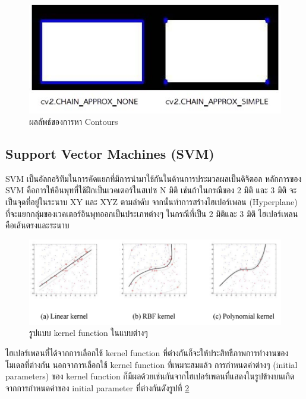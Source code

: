 		\begin{figure}[H]
			\includegraphics[width=\columnwidth]{Figures/2/chain_approx_none_vs_simple}
			\caption{ผลลัพธ์ของการหา Contours}
			\label{Fig:chain_approx_none_vs_simple}
		\end{figure}
	
	
	\subsection{Support Vector Machines (SVM)}
	SVM เป็นอัลกอริทึมในการคัดแยกที่มีการนำมาใช้กันในด้านการประมวลผลเป็นดิจิตอล 
	หลักการของ SVM คือการให้อินพุทที่ใช้ฝึกเป็นเวคเตอร์ในสเปซ N มิติ เช่นถ้าในกรณีของ 2 มิติ และ 3 มิติ 
	จะเป็นจุดที่อยู่ในระนาบ XY และ XYZ ตามลำดับ จากนั้นทำการสร้างไฮเปอร์เพลน (Hyperplane) 
	ที่จะแยกกลุ่มของเวคเตอร์อินพุทออกเป็นประเภทต่างๆ ในกรณีที่เป็น 2 มิติและ 3 มิติ ไฮเปอร์เพลน คือเส้นตรงและระนาบ 
	
	\begin{figure}[H]
		\includegraphics[width=\columnwidth]{Figures/2/format-kernel-function}
		\caption{รูปแบบ kernel function ในแบบต่างๆ}
		\label{Fig:format-kernel-function}
	\end{figure}

	ไฮเปอร์เพลนที่ได้จากการเลือกใช้ kernel function ที่ต่างกันก็จะให้ประสิทธืภาพการทำงานของโมเดลที่ต่างกัน นอกจาการเลือกใช้ kernel function ที่เหมาะสมแล้ว การกำหนดค่าต่างๆ (initial parameters) ของ kernel function ก็มีผลด้วยเช่นกันจากไฮเปอร์เพลนที่แสดงในรูปข้างบนเกิดจากการกำหนดค่าของ initial parameter ที่ต่างกันดังรูปที่ \ref{Fig:format-kernel-function}


